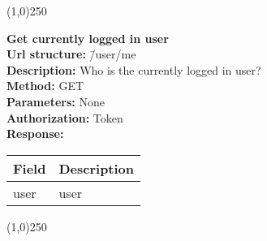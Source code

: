 \documentclass[11pt]{article}
\begin{document}
\begin{center}\line(1,0){250}\end{center}

\begin{tabbing}
\textbf{Get currently logged in user} \\
\textcolor{black!60}{\textbf{Url structure:}} \hspace{0.2in} \= /user/me \\
\textcolor{black!60}{\textbf{Description:}}  \> Who is the currently logged in user? \\
\textcolor{black!60}{\textbf{Method:}} \> GET \\
\textcolor{black!60}{\textbf{Parameters:}}  \> None \\
\textcolor{black!60}{\textbf{Authorization:}} \> Token \\
\textcolor{black!60}{\textbf{Response:}} \\ \>
\begin{tabular}{|l|l|}
\hline
 Field  &  Description  \\
\hline
 user   &  user         \\
\hline
\end{tabular}
\end{tabbing}

\begin{center}\line(1,0){250}\end{center}
\end{document}
